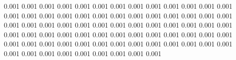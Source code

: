 0.001      0.001      %
0.001      0.001      %
0.001      0.001      %
0.001      0.001      %
0.001      0.001      %
0.001      0.001      %
0.001      0.001      %
0.001      0.001      %
0.001      0.001      %
0.001      0.001      %
0.001      0.001      %
0.001      0.001      %
0.001      0.001      %
0.001      0.001      %
0.001      0.001      %
0.001      0.001      %
0.001      0.001      %
0.001      0.001      %
0.001      0.001      %
0.001      0.001      %
0.001      0.001      %
0.001      0.001      %
0.001      0.001      %
0.001      0.001      %
0.001      0.001      %
0.001      0.001      %
0.001      0.001      %
0.001      0.001      %
0.001      0.001      %
0.001      0.001      %
0.001      0.001      %
0.001      0.001      %
0.001      0.001      %
0.001      0.001      %
0.001      0.001      %
0.001      0.001      %
0.001      0.001      %
